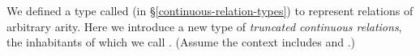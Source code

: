We defined a type called  (in \S\ref{continuous-relation-types}) to represent relations of arbitrary arity. Here we introduce a new type of \emph{truncated continuous relations}, the inhabitants of which we call . (Assume the context includes \AgdaSpace{}%
\AgdaSymbol{:}\AgdaSpace{}%
 and \AgdaSpace{}%
\AgdaSymbol{:}\AgdaSpace{}%
\AgdaSpace{}%
.)
\ccpad
\begin{code}%
\>[0][@{}l@{\AgdaIndent{0}}]%
\>[1]\AgdaSpace{}%
\AgdaSymbol{:}\AgdaSpace{}%
\AgdaSymbol{\{}\AgdaSpace{}%
\AgdaSymbol{:}\AgdaSpace{}%
\AgdaSpace{}%
\AgdaSymbol{\}\{}\AgdaSpace{}%
\AgdaSymbol{:}\AgdaSpace{}%
\AgdaSymbol{\}}\AgdaSpace{}%
\AgdaSpace{}%
\AgdaSpace{}%
\AgdaSpace{}%
\AgdaSpace{}%
%
\>[55]\AgdaSpace{}%
\AgdaSpace{}%
\AgdaSpace{}%
\AgdaSpace{}%
\AgdaSpace{}%
\AgdaSpace{}%
\<%
\\
%
\>[1]\AgdaSpace{}%
\AgdaSymbol{\{}\AgdaSpace{}%
\AgdaSymbol{=}\AgdaSpace{}%
\AgdaSymbol{\}}\AgdaSpace{}%
\AgdaSpace{}%
\AgdaSymbol{=}\AgdaSpace{}%
\AgdaSpace{}%
\AgdaSpace{}%
\AgdaSpace{}%
\AgdaSymbol{(}\AgdaSpace{}%
\AgdaSpace{}%
\AgdaSymbol{)}\AgdaSpace{}%

\end{code}
